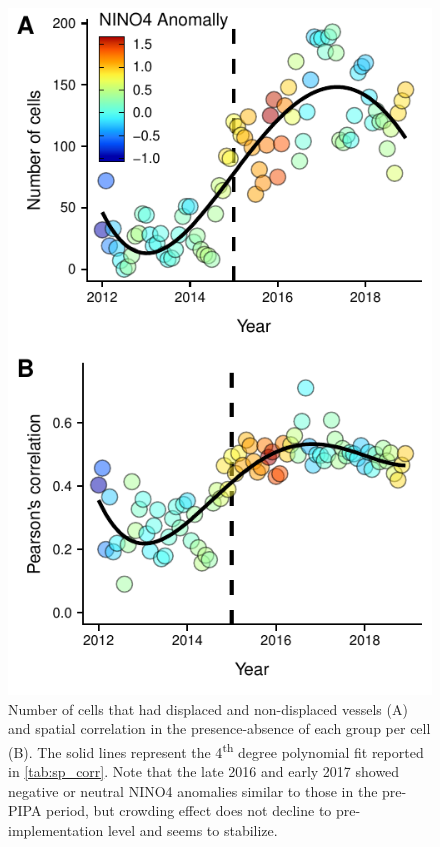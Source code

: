 \documentclass[12pt]{article}
\begin{document}
\begin{figure}[htbp]
\centering
\includegraphics{img/sp_corr.pdf}
\caption{\label{fig:sp_corr}Number of cells that had displaced and non-displaced vessels (A) and spatial correlation in the presence-absence of each group per cell (B). The solid lines represent the 4\textsuperscript{th} degree polynomial fit reported in \ref{tab:sp_corr}. Note that the late 2016 and early 2017 showed negative or neutral NINO4 anomalies similar to those in the pre-PIPA period, but crowding effect does not decline to pre-implementation level and seems to stabilize.}
\end{figure}
\end{document}
